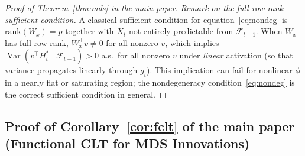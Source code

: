 \documentclass[bj,authoryear]{imsart}
\theoremstyle{plain}
\theoremstyle{definition}
\newcommand{\F}{\mathcal{F}}
\DeclareMathOperator{\Var}{Var}
\begin{document}
\begin{proof}[Proof of Theorem~\ref{thm:mds} in the main paper]
  \emph{Remark on the full row rank sufficient condition.}
  A classical sufficient condition for equation~\eqref{eq:nondeg} is
  $\mathrm{rank}(W_x)=p$ together with $X_t$ not entirely predictable
  from $\F_{t-1}$.  When $W_x$ has full row rank,
  $W_x^\top v\neq0$ for all nonzero $v$, which implies
  $\Var(v^\top H_t^*\mid\F_{t-1})>0$ a.s.\ for all nonzero $v$ under \emph{linear} activation (so that variance propagates linearly through $g_t$).
  This implication can fail for nonlinear $\phi$ in a nearly flat or saturating region; the nondegeneracy condition~\eqref{eq:nondeg}
  is the correct sufficient condition in general.
\end{proof}

\subsection{Proof of Corollary~\ref{cor:fclt} of the main paper (Functional CLT for MDS Innovations)}
\label{app:proof-corfclt}
\end{document}
